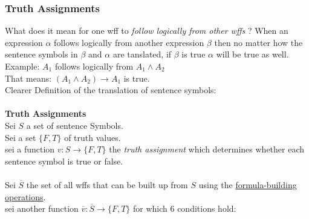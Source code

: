 \documentclass[12pt, letterpaper]{article}
\begin{document}
\subsubsection{Truth Assignments}
\label{sec:Truth Assignments}
What does it mean for one wff to \textit{follow logically from other wffs}	?
When an expression $\alpha$ follows logically from another expression $\beta$ then no matter how the sentence symbols in $\beta$ and $\alpha$ are tanslated, if $\beta$ is true $\alpha$ will be true as well.\\
Example: $A_{1} $ follows logically from $A_{1}\land A_{2}$
\\That means: $(A_{1}\land A_{2})\rightarrow A_{1}$ is true.
\\Clearer Definition of the translation of sentence symbols:\\\\ \textbf{Truth Assignments}	\\
Sei $S$ a set of sentence Symbols.\\
Sei a set $\{F, T\}$ of truth values.\\
sei a function $v: S\rightarrow \{F,T\}$ the \textit{truth assignment}	 which determines whether each sentence symbol is true or false.\\
\\
Sei $\overline{S}$ the set of all wffs that can be built up from $S$ using the \hyperref[sec:well formed formulas]{formula-building operations}.\\

sei another function $\overline{v}: \overline{S}\rightarrow \{F, T\}$ for which 6 conditions hold:\\
\end{document}
